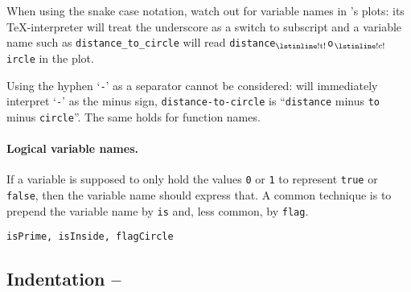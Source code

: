 
When using the snake case notation, watch out for variable names in
\matlab{}'s plots: its \TeX-interpreter will treat the underscore as a switch
to subscript and a variable name such as \lstinline!distance_to_circle! will
read
\lstinline!distance!$_{\text{\lstinline!t!}}$\lstinline!o!$_{\text{\lstinline!c!}}$\lstinline!ircle!
in the plot.

\begin{remark}
Using the hyphen `\lstinline!-!' as a separator cannot be considered:
\matlab{} will immediately interpret `\lstinline!-!' as the minus sign,
\lstinline!distance-to-circle! is ``\lstinline!distance! minus \lstinline!to!
minus \lstinline!circle!''. The same holds for function names.
\end{remark}


\paragraph{Logical variable names.}
If a variable is supposed to only hold the values \lstinline!0! or
\lstinline!1! to represent \lstinline!true! or \lstinline!false!, then the
variable name should express that. A common technique is to prepend the
variable name by \lstinline!is! and, less common, by \lstinline!flag!.
\begin{lstlisting}
isPrime, isInside, flagCircle
\end{lstlisting}


\subsection{Indentation -- \cleansymbol\cleansymbol\cleansymbol\cleansymbol}

